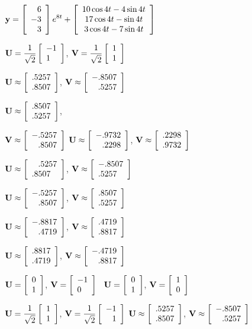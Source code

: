 \smallskip
{}
$\dst{{\bf y}=\threecol6{-3}3e^{8t}
+\left[\begin{array}{c}10\cos4t-4\sin4t\\17\cos4t-\sin4t\\3\cos4t-7\sin4t
\end{array}\right]}$

\smallskip
{}
 ${\bf U}=\dst{\frac{1}{\sqrt{2}}\twocol{-1}1}$,
${\bf V}=\dst{\frac{1}{\sqrt{2}}\twocol11}$\;

 ${\bf U}\approx\dst{\twocol{.5257}{.8507}}$,
${\bf V}\approx\dst{\twocol{-.8507}{\phantom{-}.5257}}$

\smallskip
{}
 ${\bf U}\approx\dst{\twocol{.8507}{.5257}}$,

${\bf V}\approx\dst{\twocol{-.5257}{\phantom{-}.8507}}$\quad
{}
 ${\bf U}\approx\dst{\twocol{-.9732}{\phantom{-}.2298}}$,
${\bf V}\approx\dst{\twocol{.2298}{.9732}}$

\smallskip
{}
 ${\bf U}\approx\dst{\twocol{\phantom{-}.5257}{.8507}}$,
${\bf V}\approx\dst{\twocol{-.8507}{.5257}}$\,

 ${\bf U}\approx\dst{\twocol{-.5257}{\phantom{-}.8507}}$,
${\bf V}\approx\dst{\twocol{.8507}{.5257}}$

\smallskip
{}
 ${\bf U}\approx\dst{\twocol{-.8817}{\phantom{-}.4719}}$,
${\bf V}\approx\dst{\twocol{.4719}{.8817}}$  \quad

 ${\bf U}\approx\dst{\twocol{.8817}{.4719}}$,
${\bf V}\approx\dst{\twocol{-.4719}{\phantom{-}.8817}}$

\smallskip

 ${\bf U}=\dst{\twocol01}$, ${\bf V}=\dst{\twocol{-1}0}$ \quad \quad\quad
\;  \, \quad
{}
${\bf U}=\dst{\twocol01}$, ${\bf V}=\dst{\twocol10}$

\smallskip

 ${\bf U}=\dst{\frac{1}{\sqrt{2}}\twocol11}$,
${\bf V}=\dst{\frac{1}{\sqrt{2}}\twocol{-1}{\phantom{-}1}}$  \quad\;
 ${\bf U}\approx\dst{\twocol{.5257}{.8507}}$,
${\bf V}\approx\dst{\twocol{-.8507}{\phantom{-}.5257}}$

